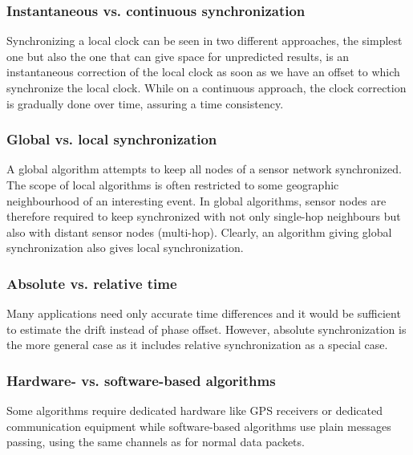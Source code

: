 \subsubsection{Instantaneous vs. continuous  synchronization}
Synchronizing a local clock can be seen in two different approaches, the simplest one but also the one that can give space for unpredicted results, is an instantaneous correction of the local clock as soon as we have an offset to which synchronize the local clock. While on a continuous approach, the clock correction is gradually done over time, assuring a time consistency.

\subsubsection{Global vs. local synchronization}
A global algorithm attempts to keep all nodes of a sensor network synchronized. The scope of local algorithms is often restricted to some geographic neighbourhood of an interesting event. In global algorithms, sensor nodes are therefore required to keep synchronized with not only single-hop neighbours but also with distant sensor nodes (multi-hop). Clearly, an algorithm giving global synchronization also gives local synchronization.

\subsubsection{Absolute vs. relative time}
Many applications need only accurate time differences and it would be sufficient to estimate the drift instead of phase offset. However, absolute synchronization is the more general case as it includes relative synchronization as a special case.

\subsubsection{Hardware- vs. software-based algorithms}
Some algorithms require dedicated hardware like \ac{GPS} receivers or dedicated communication equipment while software-based algorithms use plain messages passing, using the same channels as for normal data packets.

